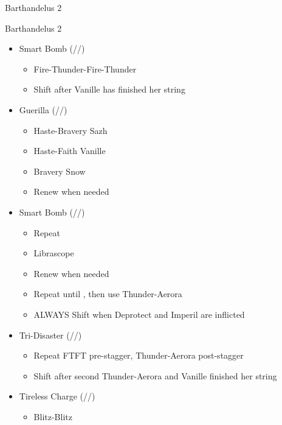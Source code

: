 \begin{paracol}{2}
\begin{battle}{Barthandelus 2}
	\end{battle}
	\switchcolumn
	\renewcommand{\first}{[1] Tireless Charge (\com/\com/\med)}
	\renewcommand{\second}{[2] Tri-Disaster (\rav/\rav/\rav)}
	\renewcommand{\third}{[3] Smart Bomb (\rav/\rav/\sab)}
	\renewcommand{\fourth}{[4] Aggression (\com/\com/\rav)}
	\renewcommand{\fifth}{[5] Guerilla (\syn/\rav/\sab)}
	\renewcommand{\sixth}{[6] Aggression (\com/\com/\rav)}
	\begin{battle}{Barthandelus 2}
		\begin{itemize}
			\item \third
			      \begin{itemize}
				      \item Fire-Thunder-Fire-Thunder
				      \item Shift after Vanille has finished her string
			      \end{itemize}
			\item \fifth
			      \begin{itemize}
				      \item Haste-Bravery Sazh
				      \item Haste-Faith Vanille
				      \item Bravery Snow
				      \item Renew when needed
			      \end{itemize}
			\item \third
			      \begin{itemize}
				      \item Repeat
				      \item Librascope
				      \item Renew when needed
				      \item Repeat until \stagger, then use Thunder-Aerora
				      \item ALWAYS Shift when Deprotect and Imperil are inflicted
			      \end{itemize}
			\item \second
			      \begin{itemize}
				      \item Repeat FTFT pre-stagger, Thunder-Aerora post-stagger
				      \item Shift after second Thunder-Aerora and Vanille finished her string
			      \end{itemize}
			\item \first
			      \begin{itemize}
				      \item Blitz-Blitz

\end{itemize}
\end{itemize}
\end{battle}
\end{paracol}

